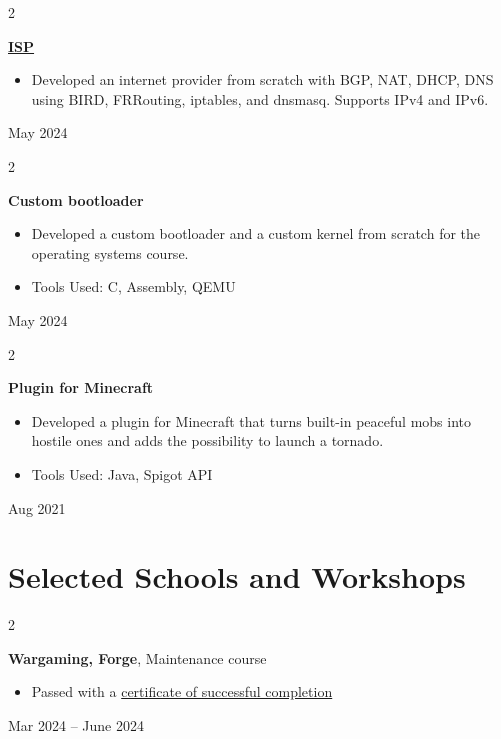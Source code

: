 \documentclass[10pt, letterpaper]{article}
\newenvironment{highlights}{
    \begin{itemize}[
        topsep=0.10 cm,
        parsep=0.10 cm,
        partopsep=0pt,
        itemsep=0pt,
        leftmargin=0.4 cm + 10pt
    ]
}{
    \end{itemize}
} %
\newenvironment{twocolentry}[2][]{
    \onecolentry
    \def\secondColumn{#2}
    \setcolumnwidth{\fill, 4.5 cm}
    \begin{paracol}{2}
}{
    \switchcolumn \raggedleft \secondColumn
    \end{paracol}
    \endonecolentry
} %
\begin{document}
        \vspace{0.2 cm}

        \begin{twocolentry}{
            May 2024
        }
            \textbf{\href{https://github.com/asahium/isp}{ISP}}
            \begin{highlights}
                \item Developed an internet provider from scratch with BGP, NAT, DHCP, DNS using BIRD, FRRouting, iptables, and dnsmasq. Supports IPv4 and IPv6.
            \end{highlights}
        \end{twocolentry}


        \vspace{0.2 cm}

        \begin{twocolentry}{
            May 2024
        }
            \textbf{Custom bootloader}
            \begin{highlights}
                \item Developed a custom bootloader and a custom kernel from scratch for the operating systems course.
                \item Tools Used: C, Assembly, QEMU
            \end{highlights}
        \end{twocolentry}


        \vspace{0.2 cm}

        \begin{twocolentry}{
            Aug 2021
        }
            \textbf{Plugin for Minecraft}
            \begin{highlights}
                \item Developed a plugin for Minecraft that turns built-in peaceful mobs into hostile ones and adds the possibility to launch a tornado.
                \item Tools Used: Java, Spigot API
            \end{highlights}
        \end{twocolentry}



    
    \section{Selected Schools and Workshops}



        
        \begin{twocolentry}{
            Mar 2024 – June 2024
        }
            \textbf{Wargaming, Forge}, Maintenance course
            \begin{highlights}
                \item Passed with a \href{https://drive.google.com/file/d/1p-x37Ugsu4JONwdZj5UdreDqEqGhXrW3/view?usp=sharing}{certificate of successful completion}
            \end{highlights}
        \end{twocolentry}
\end{document}
